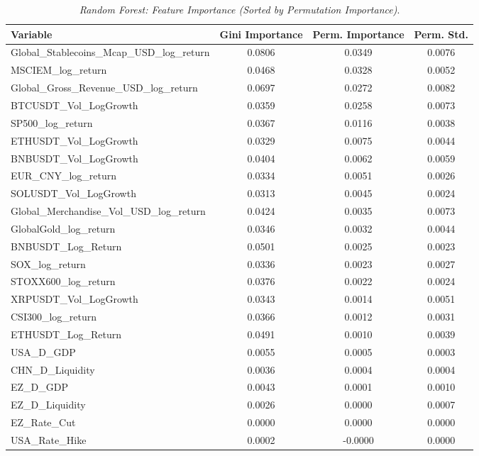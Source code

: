 \begin{table}[h]
  \centering
  \caption{\textit{Random Forest: Feature Importance (Sorted by Permutation Importance)}.}
  \label{tab:rfimportance}
  \begin{tabular}{lccc}
    \toprule
    \textbf{Variable} & \textbf{Gini Importance} & \textbf{Perm. Importance} & \textbf{Perm. Std.} \\ 
    \midrule
    Global\_Stablecoins\_Mcap\_USD\_log\_return & 0.0806 & 0.0349 & 0.0076 \\ 
    MSCIEM\_log\_return & 0.0468 & 0.0328 & 0.0052 \\ 
    Global\_Gross\_Revenue\_USD\_log\_return & 0.0697 & 0.0272 & 0.0082 \\ 
    BTCUSDT\_Vol\_LogGrowth & 0.0359 & 0.0258 & 0.0073 \\ 
    SP500\_log\_return & 0.0367 & 0.0116 & 0.0038 \\ 
    ETHUSDT\_Vol\_LogGrowth & 0.0329 & 0.0075 & 0.0044 \\ 
    BNBUSDT\_Vol\_LogGrowth & 0.0404 & 0.0062 & 0.0059 \\ 
    EUR\_CNY\_log\_return & 0.0334 & 0.0051 & 0.0026 \\ 
    SOLUSDT\_Vol\_LogGrowth & 0.0313 & 0.0045 & 0.0024 \\ 
    Global\_Merchandise\_Vol\_USD\_log\_return & 0.0424 & 0.0035 & 0.0073 \\ 
    GlobalGold\_log\_return & 0.0346 & 0.0032 & 0.0044 \\ 
    BNBUSDT\_Log\_Return & 0.0501 & 0.0025 & 0.0023 \\ 
    SOX\_log\_return & 0.0336 & 0.0023 & 0.0027 \\ 
    STOXX600\_log\_return & 0.0376 & 0.0022 & 0.0024 \\ 
    XRPUSDT\_Vol\_LogGrowth & 0.0343 & 0.0014 & 0.0051 \\ 
    CSI300\_log\_return & 0.0366 & 0.0012 & 0.0031 \\ 
    ETHUSDT\_Log\_Return & 0.0491 & 0.0010 & 0.0039 \\ 
    USA\_D\_GDP & 0.0055 & 0.0005 & 0.0003 \\ 
    CHN\_D\_Liquidity & 0.0036 & 0.0004 & 0.0004 \\ 
    EZ\_D\_GDP & 0.0043 & 0.0001 & 0.0010 \\ 
    EZ\_D\_Liquidity & 0.0026 & 0.0000 & 0.0007 \\ 
    EZ\_Rate\_Cut & 0.0000 & 0.0000 & 0.0000 \\ 
    USA\_Rate\_Hike & 0.0002 & -0.0000 & 0.0000 \\ 

\end{tabular}
\end{table}
